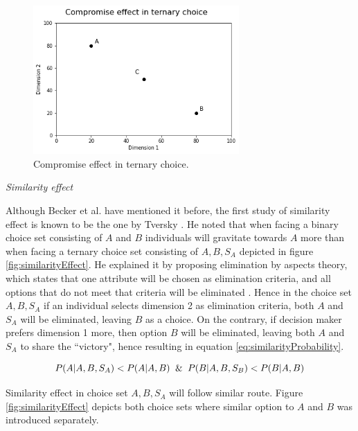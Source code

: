 \documentclass[a4paper,12pt]{article}
\newcommand{\citeyearonly}[1]{\citeyearpar{#1}}
\begin{document}
\begin{figure}[h]
    \centering
    \includegraphics[width=0.7\textwidth]{staticFiles/compromiseEffect.png}
    \caption{Compromise effect in ternary choice.} %
    \label{fig:compromiseEffect} %

\end{figure}

\textit{Similarity effect}

Although Becker et al. \citeyearonly{becker1964measuring} have mentioned it before, the first study of similarity effect is known to be the one by Tversky \citep{tversky1972elimination}. He noted that when facing a binary choice set consisting of $A$ and $B$ individuals will gravitate towards $A$ more than when facing a ternary choice set consisting of ${A, B, S_A}$ depicted in figure \ref{fig:similarityEffect}. He explained it by proposing elimination by aspects theory, which states that one attribute will be chosen as elimination criteria, and all options that do not meet that criteria will be eliminated \citep{tversky1972elimination}. Hence in the choice set ${A, B, S_A}$ if an individual selects dimension 2 as elimination criteria, both $A$ and $S_A$ will be eliminated, leaving $B$ as a choice. On the contrary, if decision maker prefers dimension 1 more, then option 
$B$ will be eliminated, leaving both $A$ and $S_A$ to share the ``victory", hence resulting in equation \ref{eq:similarityProbability}.

\begin{equation}\label{eq:similarityProbability}
    P(A|A,B,S_A) < P(A|A,B) \And  P(B|A,B,S_B) < P(B|A,B)
\end{equation}

Similarity effect in choice set ${A, B, S_A}$ will follow similar route. Figure \ref{fig:similarityEffect} depicts both choice sets where similar option to $A$ and $B$ was introduced separately.
\end{document}
